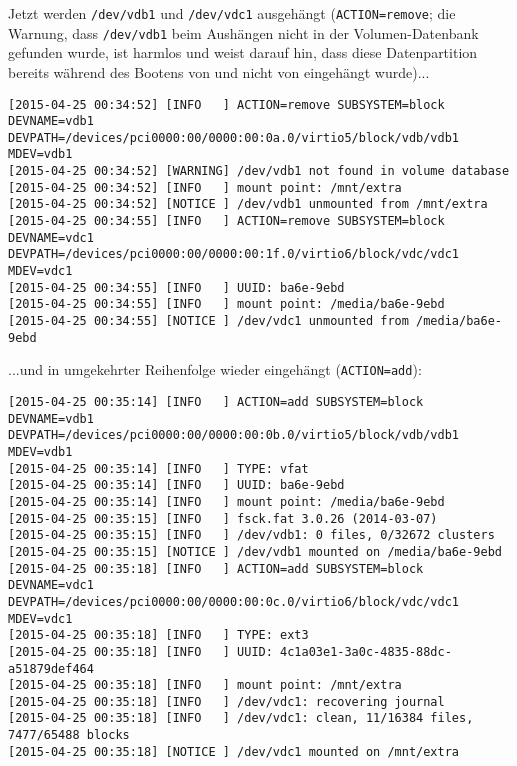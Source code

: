     Jetzt werden \texttt{/dev/vdb1} und \texttt{/dev/vdc1} ausgehängt
    (\texttt{ACTION=remove}; die Warnung, dass \texttt{/dev/vdb1} beim
    Aushängen nicht in der Volumen-Datenbank gefunden wurde, ist harmlos und
    weist darauf hin, dass diese Datenpartition bereits während des Bootens
    von  und nicht von  eingehängt
    wurde)...

\begin{tiny}
\begin{verbatim}
[2015-04-25 00:34:52] [INFO   ] ACTION=remove SUBSYSTEM=block DEVNAME=vdb1 DEVPATH=/devices/pci0000:00/0000:00:0a.0/virtio5/block/vdb/vdb1 MDEV=vdb1
[2015-04-25 00:34:52] [WARNING] /dev/vdb1 not found in volume database
[2015-04-25 00:34:52] [INFO   ] mount point: /mnt/extra
[2015-04-25 00:34:52] [NOTICE ] /dev/vdb1 unmounted from /mnt/extra
[2015-04-25 00:34:55] [INFO   ] ACTION=remove SUBSYSTEM=block DEVNAME=vdc1 DEVPATH=/devices/pci0000:00/0000:00:1f.0/virtio6/block/vdc/vdc1 MDEV=vdc1
[2015-04-25 00:34:55] [INFO   ] UUID: ba6e-9ebd
[2015-04-25 00:34:55] [INFO   ] mount point: /media/ba6e-9ebd
[2015-04-25 00:34:55] [NOTICE ] /dev/vdc1 unmounted from /media/ba6e-9ebd
\end{verbatim}
\end{tiny}

    ...und in umgekehrter Reihenfolge wieder eingehängt (\texttt{ACTION=add}):

\begin{tiny}
\begin{verbatim}
[2015-04-25 00:35:14] [INFO   ] ACTION=add SUBSYSTEM=block DEVNAME=vdb1 DEVPATH=/devices/pci0000:00/0000:00:0b.0/virtio5/block/vdb/vdb1 MDEV=vdb1
[2015-04-25 00:35:14] [INFO   ] TYPE: vfat
[2015-04-25 00:35:14] [INFO   ] UUID: ba6e-9ebd
[2015-04-25 00:35:14] [INFO   ] mount point: /media/ba6e-9ebd
[2015-04-25 00:35:15] [INFO   ] fsck.fat 3.0.26 (2014-03-07)
[2015-04-25 00:35:15] [INFO   ] /dev/vdb1: 0 files, 0/32672 clusters
[2015-04-25 00:35:15] [NOTICE ] /dev/vdb1 mounted on /media/ba6e-9ebd
[2015-04-25 00:35:18] [INFO   ] ACTION=add SUBSYSTEM=block DEVNAME=vdc1 DEVPATH=/devices/pci0000:00/0000:00:0c.0/virtio6/block/vdc/vdc1 MDEV=vdc1
[2015-04-25 00:35:18] [INFO   ] TYPE: ext3
[2015-04-25 00:35:18] [INFO   ] UUID: 4c1a03e1-3a0c-4835-88dc-a51879def464
[2015-04-25 00:35:18] [INFO   ] mount point: /mnt/extra
[2015-04-25 00:35:18] [INFO   ] /dev/vdc1: recovering journal
[2015-04-25 00:35:18] [INFO   ] /dev/vdc1: clean, 11/16384 files, 7477/65488 blocks
[2015-04-25 00:35:18] [NOTICE ] /dev/vdc1 mounted on /mnt/extra
\end{verbatim}
\end{tiny}

